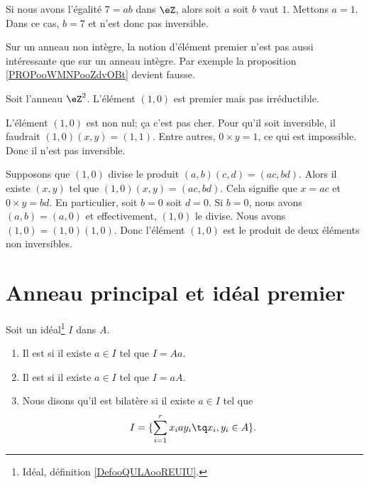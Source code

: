\begin{example}
	Si nous avons l'égalité \( 7=ab\) dans \( \eZ\), alors soit \( a\) soit \( b\) vaut \( 1\). Mettons \( a=1\). Dans ce cas, \( b=7\) et n'est donc pas inversible.
\end{example}

Sur un anneau non intègre, la notion d'élément premier n'est pas aussi intéressante que sur un anneau intègre. Par exemple la proposition \ref{PROPooWMNPooZdvOBt} devient fausse.

\begin{example}     \label{EXooEIUEooCZCPMC}
	Soit l'anneau \( \eZ^2\). L'élément \( (1,0)\) est premier mais pas irréductible.
	\begin{subproof}
		L'élément \( (1,0)\) est non nul; ça c'est pas cher. Pour qu'il soit inversible, il faudrait \( (1,0)(x,y)=(1,1)\). Entre autres, \( 0\times y=1\), ce qui est impossible. Donc il n'est pas inversible.

		Supposons que \( (1,0)\) divise le produit \( (a,b)(c,d)=(ac,bd)\). Alors il existe \( (x,y)\) tel que \( (1,0)(x,y)=(ac,bd)\). Cela signifie que \( x=ac\) et \( 0\times y=bd\). En particulier, soit \( b=0\) soit \( d=0\). Si \( b=0\), nous avons \( (a,b)=(a,0)\) et effectivement, \( (1,0)\) le divise.
		Nous avons \( (1,0)=(1,0)(1,0)\). Donc l'élément \( (1,0)\) est le produit de deux éléments non inversibles.
	\end{subproof}
\end{example}

\section{Anneau principal et idéal premier}

\begin{definition}      \label{DEFooMZRKooBPLAWH}
	Soit un idéal\footnote{Idéal, définition \ref{DefooQULAooREUIU}.} \( I\) dans \( A\).
	\begin{enumerate}
		\item
		      Il est  si il existe \( a\in I\) tel que \( I= A a\).
		\item
		      Il est  si il existe \( a\in I\) tel que \( I=a A\).
		\item
		      Nous disons qu'il est  bilatère si il existe \( a\in I\) tel que
		      \begin{equation}
			      I=\{ \sum_{i=1}^rx_iay_i\tq x_i,y_i\in A \}.
		      \end{equation}
	\end{enumerate}
\end{definition}

